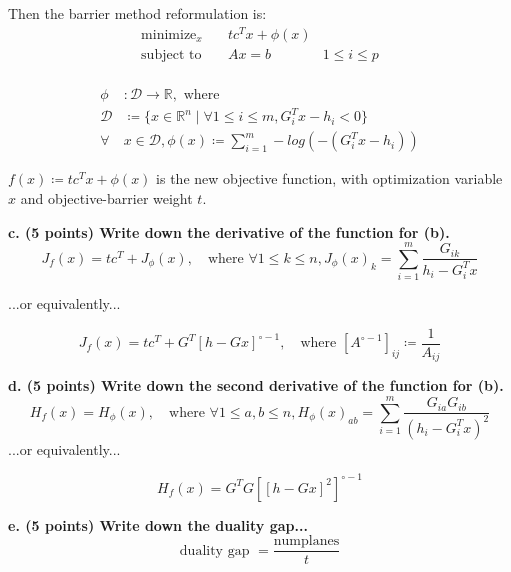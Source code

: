 \documentclass[a4paper,10pt]{article}
\theoremstyle{definition}
\begin{document}
Then the barrier method reformulation is: 
\[
\begin{aligned}
    \text{minimize}_{x} \quad & tc^Tx + \phi(x)\\
    \text{subject to} \quad & Ax = b \quad & 1 \leq i \leq p\\
\end{aligned}
\]

\[
\begin{aligned}
    \phi & : \mathcal{D} \rightarrow \mathbb{R}, \text{ where }\\
    \mathcal{D} & \coloneq \{x \in \mathbb{R} ^ n \mid \forall 1\leq i\leq m, G_i^Tx - h_i < 0\}\\
    \forall & x \in \mathcal{D}, \phi(x) \coloneq \sum_{i=1}^{m} -log(-(G_i^Tx - h_i))
\end{aligned}
\]

$f(x) \coloneq tc^Tx + \phi(x)$ is the new objective function,
with optimization variable $x$ and objective-barrier weight $t$.

\textbf{c. (5 points) Write down the derivative of the function for (b).}
\[
    J_f(x) = tc^T + J_{\phi}(x), \quad \text{where } \forall 1\leq k\leq n,
    J_{\phi}(x)_k = \sum_{i=1}^{m} \frac{G_{ik}}{h_i - G^T_i x}
\]

...or equivalently...

\[
    J_f(x) = tc^T + G^T[h - Gx]^{\circ -1}, \quad\text{where } [A^{\circ-1}]_{ij} \coloneq \frac{1}{A_{ij}}
\]

\textbf{d. (5 points) Write down the second derivative of the function for (b).}
\[
    H_f(x) = H_{\phi}(x), \quad \text{where } \forall 1\leq a,b \leq n,
    H_{\phi}(x)_{ab} = \sum_{i=1}^{m} \frac{G_{ia}G_{ib}}{(h_i - G^T_i x)^2}
\]
...or equivalently...

\[
    H_f(x) = G^TG[[h - Gx]^2]^{\circ -1}
\]

\textbf{e. (5 points) Write down the duality gap...}
\[
    \text{duality gap } = \frac {\text{numplanes}}{t}
\]
\end{document}
